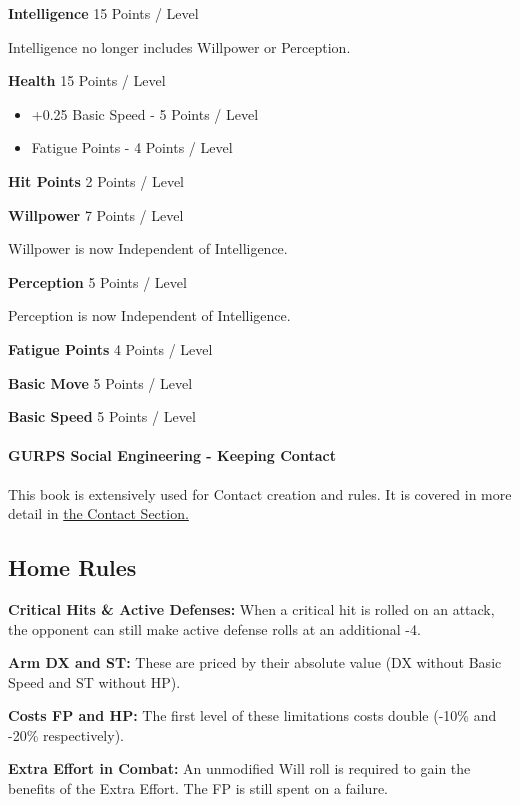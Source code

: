 \begin{multicols*}{3}
	\noindent\textbf{Intelligence}
	15 Points / Level
	
	\noindent
	Intelligence no longer includes Willpower or Perception.
	
	\noindent\textbf{Health}
	15 Points / Level
	
	\begin{itemize}
		\itemsep 0pt
		\item +0.25 Basic Speed - 5 Points / Level
		\item Fatigue Points - 4 Points / Level
	\end{itemize}
	
	\noindent\textbf{Hit Points}
	2 Points / Level
	
	\noindent\textbf{Willpower }
	7 Points / Level
	
	\noindent
	Willpower is now Independent of Intelligence.
	
	\noindent\textbf{Perception}
	5 Points / Level
	
	\noindent
	Perception is now Independent of Intelligence.
	
	\noindent\textbf{Fatigue Points}
	4 Points / Level
	
	\noindent\textbf{Basic Move}
	5 Points / Level
	
	\noindent\textbf{Basic Speed}
	5 Points / Level
	
	\paragraph{GURPS Social Engineering - Keeping Contact}
	
	This book is extensively used for Contact creation and rules. It is covered in more detail in \hyperref[Contacts]{the Contact Section.}
	
	\subsection{Home Rules}
	
	\textbf{Critical Hits \& Active Defenses:} When a critical hit is rolled on an attack, the opponent can still make active defense rolls at an additional -4.
	
	\textbf{Arm DX and ST:} These are priced by their absolute value (DX without Basic Speed and ST without HP).
	
	\textbf{Costs FP and HP:} The first level of these limitations costs double (-10\% and -20\% respectively).
	
	\textbf{Extra Effort in Combat:} An unmodified Will roll is required to gain the benefits of the Extra Effort. The FP is still spent on a failure.
	

\end{multicols*}
